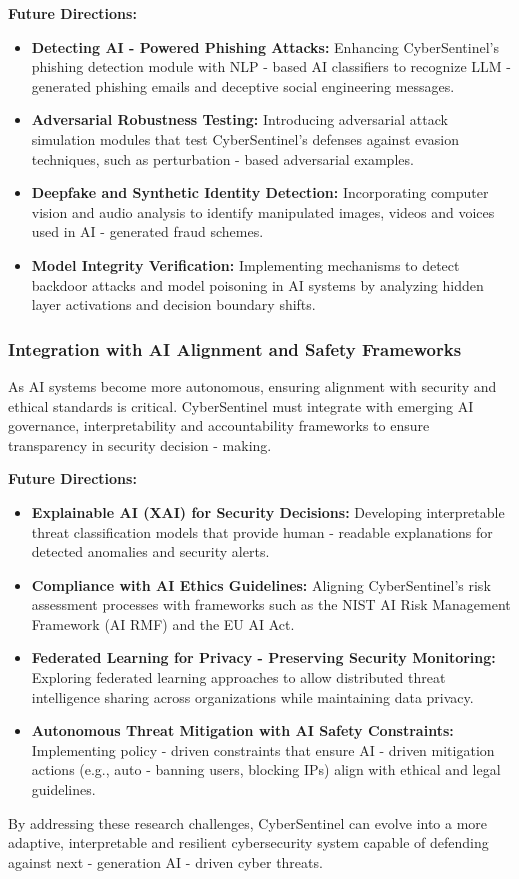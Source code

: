 \documentclass{article}
\begin{document}
\textbf{Future Directions:}
\begin{itemize}
    \item \textbf{Detecting AI - Powered Phishing Attacks:} Enhancing CyberSentinel’s phishing detection module with NLP - based AI classifiers to recognize LLM - generated phishing emails and deceptive social engineering messages.
    \item \textbf{Adversarial Robustness Testing:} Introducing adversarial attack simulation modules that test CyberSentinel’s defenses against evasion techniques, such as perturbation - based adversarial examples.
    \item \textbf{Deepfake and Synthetic Identity Detection:} Incorporating computer vision and audio analysis to identify manipulated images, videos and voices used in AI - generated fraud schemes.
    \item \textbf{Model Integrity Verification:} Implementing mechanisms to detect backdoor attacks and model poisoning in AI systems by analyzing hidden layer activations and decision boundary shifts.
\end{itemize}

\subsubsection{Integration with AI Alignment and Safety Frameworks}

As AI systems become more autonomous, ensuring alignment with security and ethical standards is critical. CyberSentinel must integrate with emerging AI governance, interpretability and accountability frameworks to ensure transparency in security decision - making.

\textbf{Future Directions:}
\begin{itemize}
    \item \textbf{Explainable AI (XAI) for Security Decisions:} Developing interpretable threat classification models that provide human - readable explanations for detected anomalies and security alerts.
    \item \textbf{Compliance with AI Ethics Guidelines:} Aligning CyberSentinel’s risk assessment processes with frameworks such as the NIST AI Risk Management Framework (AI RMF) and the EU AI Act.
    \item \textbf{Federated Learning for Privacy - Preserving Security Monitoring:} Exploring federated learning approaches to allow distributed threat intelligence sharing across organizations while maintaining data privacy.
    \item \textbf{Autonomous Threat Mitigation with AI Safety Constraints:} Implementing policy - driven constraints that ensure AI - driven mitigation actions (e.g., auto - banning users, blocking IPs) align with ethical and legal guidelines.
\end{itemize}

By addressing these research challenges, CyberSentinel can evolve into a more adaptive, interpretable and resilient cybersecurity system capable of defending against next - generation AI - driven cyber threats.



\end{document}
